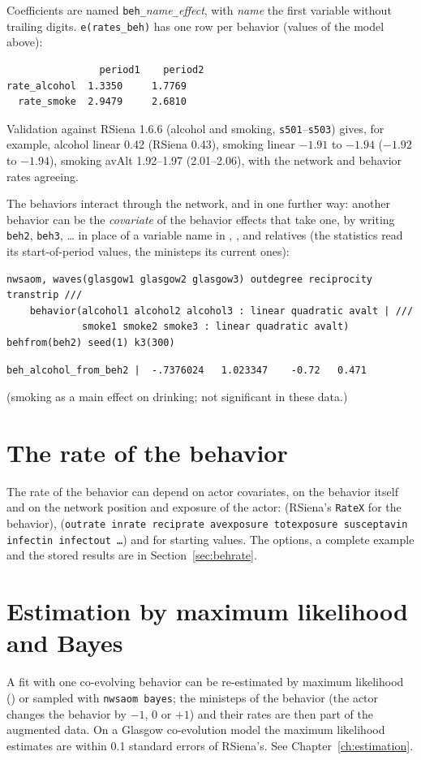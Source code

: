 Coefficients are named \texttt{beh\_}\emph{name}\texttt{\_}\emph{effect}, with \emph{name} the first variable without trailing digits. \texttt{e(rates\_beh)} has one row per behavior (values of the model above):
\begin{lstlisting}
                period1    period2
rate_alcohol  1.3350     1.7769
  rate_smoke  2.9479     2.6810
\end{lstlisting}
Validation against RSiena 1.6.6 (alcohol and smoking, \texttt{s501}--\texttt{s503}) gives, for example, alcohol linear 0.42 (RSiena 0.43), smoking linear $-1.91$ to $-1.94$ ($-1.92$ to $-1.94$), smoking avAlt 1.92--1.97 (2.01--2.06), with the network and behavior rates agreeing.

The behaviors interact through the network, and in one further way: another behavior can be the \emph{covariate} of the behavior effects that take one, by writing \texttt{beh2}, \texttt{beh3}, \dots{} in place of a variable name in , ,  and relatives (the statistics read its start-of-period values, the ministeps its current ones):
\begin{lstlisting}
nwsaom, waves(glasgow1 glasgow2 glasgow3) outdegree reciprocity transtrip ///
    behavior(alcohol1 alcohol2 alcohol3 : linear quadratic avalt | ///
             smoke1 smoke2 smoke3 : linear quadratic avalt) behfrom(beh2) seed(1) k3(300)
\end{lstlisting}
\begin{lstlisting}
beh_alcohol_from_beh2 |  -.7376024   1.023347    -0.72   0.471
\end{lstlisting}
(smoking as a main effect on drinking; not significant in these data.)

\section{The rate of the behavior}\label{sec:coev-rate}
The rate of the behavior can depend on actor covariates, on the behavior itself and on the network position and exposure of the actor:  (RSiena's \texttt{RateX} for the behavior),  (\texttt{outrate inrate reciprate avexposure totexposure susceptavin infectin infectout \ldots}) and  for starting values. The options, a complete example and the stored results are in Section~\ref{sec:behrate}.

\section{Estimation by maximum likelihood and Bayes}
A fit with one co-evolving behavior can be re-estimated by maximum likelihood () or sampled with \texttt{nwsaom bayes}; the ministeps of the behavior (the actor changes the behavior by $-1$, $0$ or $+1$) and their rates are then part of the augmented data. On a Glasgow co-evolution model the maximum likelihood estimates are within 0.1 standard errors of RSiena's. See Chapter~\ref{ch:estimation}.

